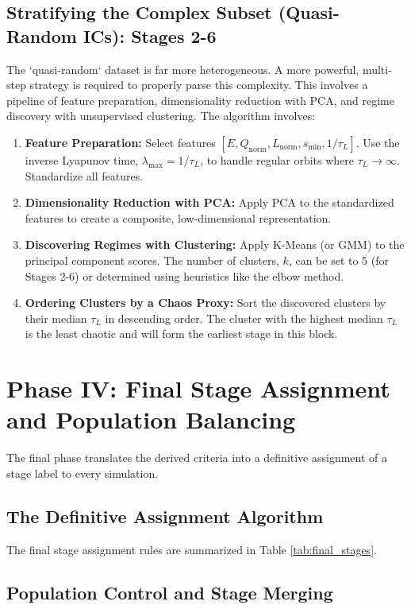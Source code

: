 \documentclass[11pt, letterpaper]{article}
\begin{document}
\subsection{Stratifying the Complex Subset (Quasi-Random ICs): Stages 2-6}

The `quasi-random` dataset is far more heterogeneous. A more powerful, multi-step strategy is required to properly parse this complexity. This involves a pipeline of feature preparation, dimensionality reduction with PCA, and regime discovery with unsupervised clustering. The algorithm involves:
\begin{enumerate}
    \item \textbf{Feature Preparation:} Select features $[E, Q_{\text{norm}}, L_{\text{norm}}, s_{\text{min}}, 1/\tau_L]$. Use the inverse Lyapunov time, $\lambda_{\text{max}} = 1/\tau_L$, to handle regular orbits where $\tau_L \to \infty$. Standardize all features.
    \item \textbf{Dimensionality Reduction with PCA:} Apply PCA to the standardized features to create a composite, low-dimensional representation.
    \item \textbf{Discovering Regimes with Clustering:} Apply K-Means (or GMM) to the principal component scores. The number of clusters, $k$, can be set to 5 (for Stages 2-6) or determined using heuristics like the elbow method.
    \item \textbf{Ordering Clusters by a Chaos Proxy:} Sort the discovered clusters by their median $\tau_L$ in descending order. The cluster with the highest median $\tau_L$ is the least chaotic and will form the earliest stage in this block.
\end{enumerate}

\section{Phase IV: Final Stage Assignment and Population Balancing}

The final phase translates the derived criteria into a definitive assignment of a stage label to every simulation.

\subsection{The Definitive Assignment Algorithm}

The final stage assignment rules are summarized in Table \ref{tab:final_stages}.

\subsection{Population Control and Stage Merging}
\end{document}

